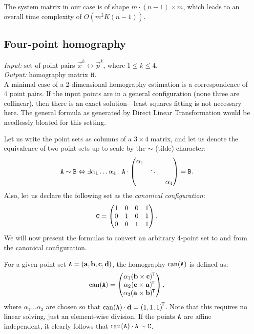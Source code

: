 
The system matrix in our case is of shape $m \cdot (n - 1) \times m$, which leads to an overall time complexity of $O(m^2 K (n - 1))$.

\subsection{Four-point homography}

\textit{Input:} set of point pairs $\vec x^k \leftrightarrow \vec p^k$, where $1 \leq k \leq 4$.\\
\textit{Output:} homography matrix $\mathtt{H}$.\\

A minimal case of a 2-dimensional homography estimation is a correspondence of 4 point pairs.
If the input points are in a general configuration (none three are collinear), then there is an exact solution---least squares fitting is not necessary here.
The general formula as generated by Direct Linear Transformation would be needlessly bloated for this setting.


Let us write the point sets as columns of a $3 \times 4$ matrix, and let us denote the equivalence of two point sets up to scale by the $\sim$ (tilde) character:
$$\mathtt{A} \sim \mathtt{B} \Leftrightarrow \exists \alpha_1 \dots \alpha_4 : \mathtt{A} \cdot \begin{pmatrix}
 \alpha_1 & & \\
  & \ddots & \\
 & & \alpha_4
 \end{pmatrix} = \mathtt{B}.$$
Also, let us declare the following set as the \textit{canonical configuration}:
$$\mathtt{C} = \begin{pmatrix}
 1 & 0 & 0 & 1 \\
 0 & 1 & 0 & 1 \\
 0 & 0 & 1 & 1
 \end{pmatrix}.$$
We will now present the formulas to convert an arbitrary 4-point set to and from the canonical configuration.

For a given point set $\mathtt{A} = \left( \mathbf{a}, \mathbf{b}, \mathbf{c}, \mathbf{d} \right)$, the homography $\mathrm{can}(\mathtt{A})$ is defined as:
$$\mathrm{can}(\mathtt{A}) = \begin{pmatrix}
 \alpha_1 (\mathbf{b} \times \mathbf{c}) ^{\!\mathsf{T}} \\
 \alpha_2 (\mathbf{c} \times \mathbf{a}) ^{\!\mathsf{T}} \\
 \alpha_3 (\mathbf{a} \times \mathbf{b}) ^{\!\mathsf{T}} \\
 \end{pmatrix},
$$
where $\alpha_1 \dots \alpha_3$ are chosen so that $\mathrm{can}(\mathtt{A}) \cdot \mathbf{d} = \left( 1, 1, 1 \right)^{\!\mathsf{T}}$.
Note that this requires no linear solving, just an element-wise division.
If the points $\mathtt{A}$ are affine independent, it clearly follows that $\mathrm{can}(\mathtt{A}) \cdot \mathtt{A} \sim \mathtt{C}$.

